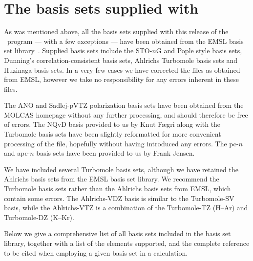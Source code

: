 \section{The basis sets supplied with \dalton }
\label{sec:basislist}

As was mentioned above, all the basis sets supplied with this release
of the \dalton\ program --- with a few exceptions --- have been obtained 
from the EMSL basis set library~\cite{emslref}. 
Supplied basis sets include the STO-$n$G and Pople style basis sets,
Dunning's correlation-consistent basis 
sets, 
Ahlrichs Turbomole basis sets and Huzinaga basis sets. 
In a very few cases we have corrected the
files as obtained from EMSL, however we take no responsibility
for any errors inherent in these files.

The ANO and Sadlej-pVTZ polarization basis sets have been obtained from the
MOLCAS homepage without any further processing, and should therefore
be free of errors. The NQvD basis provided to us by Knut F\ae gri 
along with the Turbomole basis sets have been slightly reformatted for more 
convenient processing of the file, hopefully without having introduced any errors. 
The pc-$n$ and apc-$n$ basis sets have been provided to us by Frank Jensen.

We have included several Turbomole basis sets,
although we have retained the Ahlrichs basis sets
from the EMSL basis set library. We recommend the Turbomole
basis sets rather than the Ahlrichs basis sets from EMSL, which
contain some errors. The Ahlrichs-VDZ basis
is similar to the Turbomole-SV basis, while the Ahlrichs-VTZ is a
combination of the Turbomole-TZ (H--Ar) and Turbomole-DZ (K--Kr).

Below we give a comprehensive list of all basis sets included in 
the basis set library, together with 
a list of the elements supported, and the complete reference to be 
cited when employing a given basis set in a calculation. 

